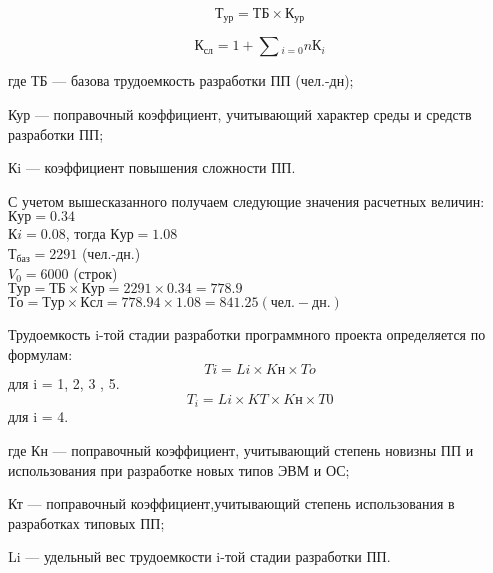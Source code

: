 \begin{equation}
    Т_{ур} = ТБ \times{} К_{ур}
\end{equation}

\begin{equation}
    К_{сл} = 1 + \sum{}_{i=0}{n}К_i
\end{equation}
\begin{ESKDexplanation}
    \item[где ]{} ТБ --- базова трудоемкость разработки ПП (чел.-дн);
    \item{} Кур --- поправочный коэффициент, учитывающий характер среды и средств разработки ПП;
    \item{} Кi --- коэффициент повышения сложности ПП.
\end{ESKDexplanation}

\begin{par}
С учетом вышесказанного получаем следующие значения расчетных величин:
$Кур = 0.34$ \\
$Кi  =  0.08$,  тогда  $Кур = 1.08$ \\
$Т_{баз} = 2291$ (чел.-дн.) \\
$V_0 = 6000$ (строк) \\
$Тур = ТБ \times{} Кур = 2291 \times{} 0.34 = 778.9$ \\
$То =  Тур \times{} Ксл = 778.94 \times{} 1.08 = 841.25 (чел.-дн.) $ \\
\end{par}

\begin{par}
Трудоемкость i-той стадии разработки программного проекта определяется
по формулам: 
\begin{equation}
	Ti = Li \times{} Kн \times{} To
\end{equation}
для i = 1, 2, 3 , 5.
\begin{equation}
	T_i = Li \times{}  KT \times{} Kн \times{} T0
\end{equation}
для i = 4.
\end{par}

\begin{ESKDexplanation}
	\item[где ]{} Кн --- поправочный коэффициент, учитывающий степень новизны ПП и
		использования при разработке новых типов ЭВМ и ОС;
	\item{} Кт --- поправочный коэффициент,учитывающий степень использования в разработках типовых ПП;
	\item{} Li --- удельный вес трудоемкости i-той стадии разработки ПП.
\end{ESKDexplanation}

